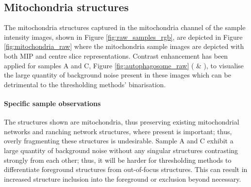 \subsection{Mitochondria structures}
The mitochondria structures captured in the mitochondria channel of the sample intensity images, shown in Figure \ref{fig:raw_samples_rgb}, are depicted in Figure \ref{fig:mitochondria_raw} where the mitochondria sample images are depicted with both MIP and centre slice representations. Contrast enhancement has been applied for samples A and C, Figure \ref{fig:autophagosome_raw} ( \& ), to visualise the large quantity of background noise present in these images which can be detrimental to the thresholding methods' binarisation. \paragraph{Specific sample observations} The structures shown are mitochondria, thus preserving existing mitochondrial networks and ranching network structures, where present is important; thus, overly fragmenting these structures is undesirable. Sample A and C exhibit a large quantity of background noise without any singular structures contrasting strongly from each other; thus, it will be harder for thresholding methods to differentiate foreground structures from out-of-focus structures. This can result in increased structure inclusion into the foreground or exclusion beyond necessary. 
